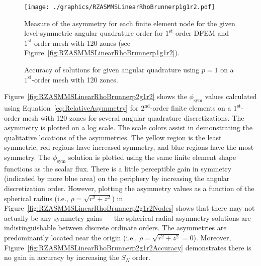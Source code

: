 \documentclass[12pt]{article}
\begin{document}
\begin{figure}[!htb]
\centering
\texttt{[image: ./graphics/RZASMMSLinearRhoBrunnerp1g1r2.pdf]}
\caption{Measure of the asymmetry for each finite element node for the given level-symmetric angular quadrature order for $1^\text{st}$-order DFEM and $1^\text{st}$-order mesh with 120 zones (see Figure~\ref{fig:RZASMMSLinearRhoBrunnerp1g1r2}).}
\label{fig:RZASMMSLinearRhoBrunnerp1g1r2Nodes}
\end{figure}

\begin{figure}[!htb]
\centering
{}
\caption{Accuracy of solutions for given angular quadrature using $p=1$ on a $1^\text{st}$-order mesh with 120 zones.}
\label{fig:RZASMMSLinearRhoBrunnerp1g1r2Accuracy}
\end{figure}

\FloatBarrier

Figure~\ref{fig:RZASMMSLinearRhoBrunnerp2g1r2} shows the $\phi_\text{sym}$ values calculated using Equation~\ref{eq:RelativeAsymmetry} for $2^\text{nd}$-order finite elements on a $1^\text{st}$-order mesh with 120 zones for several angular quadrature discretizations. The asymmetry is plotted on a log scale. The scale colors assist in demonstrating the qualitative locations of the asymmetries. The yellow region is the least symmetric, red regions have increased symmetry, and blue regions have the most symmetry. The $\phi_\text{sym}$ solution is plotted using the same finite element shape functions as the scalar flux. There is a little perceptible gain in symmetry (indicated by more blue area) on the periphery by increasing the angular discretization order. However, plotting the asymmetry values as a function of the spherical radius (i.e., $\rho=\sqrt{r^2+z^2}$) in Figure~\ref{fig:RZASMMSLinearRhoBrunnerp2g1r2Nodes} shows that there may not actually be any symmetry gains --- the spherical radial asymmetry solutions are indistinguishable between discrete ordinate orders. The asymmetries are predominantly located near the origin (i.e., $\rho=\sqrt{r^2+z^2}=0$). Moreover, Figure~\ref{fig:RZASMMSLinearRhoBrunnerp2g1r2Accuracy} demonstrates there is no gain in accuracy by increasing the $S_N$ order.
\end{document}
